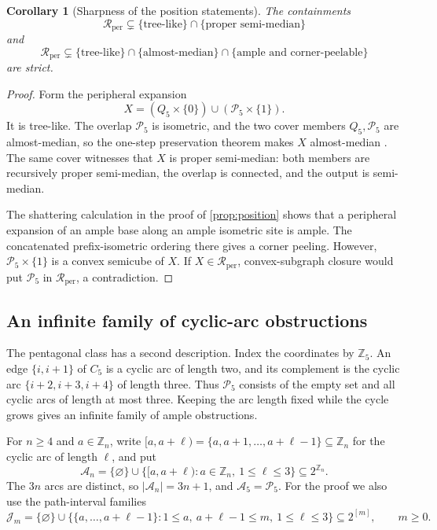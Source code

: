 \documentclass[11pt]{article}
\newtheorem{corollary}[theorem]{Corollary}
\theoremstyle{definition}
\theoremstyle{remark}
\newcommand{\Rper}{\mathcal R_{\mathrm{per}}}
\begin{document}
\begin{corollary}[Sharpness of the position statements]
\label{cor:position-sharp}
The containments
\[
 \Rper\subsetneq
 \{\text{tree-like}\}\cap\{\text{proper semi-median}\}
\]
and
\[
 \Rper\subsetneq
 \{\text{tree-like}\}\cap\{\text{almost-median}\}
 \cap\{\text{ample and corner-peelable}\}
\]
are strict.
\end{corollary}

\begin{proof}
Form the peripheral expansion
\[
 X=(Q_5\times\{0\})\cup(\mathcal P_5\times\{1\}).
\]
It is tree-like.  The overlap \(\mathcal P_5\) is isometric, and the two
cover members \(Q_5,\mathcal P_5\) are almost-median, so the one-step
preservation theorem makes \(X\) almost-median
\cite[Theorem~4]{BresarImrichKlavzar03fast}.  The same cover witnesses that
\(X\) is proper semi-median: both members are recursively proper
semi-median, the overlap is connected, and the output is semi-median.

The shattering calculation in the proof of \cref{prop:position} shows that a
peripheral expansion of an ample base along an ample isometric site is
ample.  The concatenated prefix-isometric ordering there gives a corner
peeling.  However, \(\mathcal P_5\times\{1\}\) is a convex semicube of
\(X\).  If \(X\in\Rper\), convex-subgraph closure would put
\(\mathcal P_5\) in \(\Rper\), a contradiction.
\end{proof}

\subsection{An infinite family of cyclic-arc obstructions}

The pentagonal class has a second description.  Index the coordinates by
\(\mathbb Z_5\).  An edge \(\{i,i+1\}\) of \(C_5\) is a cyclic arc of length
two, and its complement is the cyclic arc \(\{i+2,i+3,i+4\}\) of length three.
Thus \(\mathcal P_5\) consists of the empty set and all cyclic arcs of length
at most three.  Keeping the arc length fixed while the cycle grows gives an
infinite family of ample obstructions.

For \(n\ge4\) and \(a\in\mathbb Z_n\), write
\([a,a+\ell)=\{a,a+1,\ldots,a+\ell-1\}\subseteq\mathbb Z_n\) for the
cyclic arc of length \(\ell\), and put
\begin{equation}
 \mathcal A_n=\{\varnothing\}\cup
 \{[a,a+\ell):a\in\mathbb Z_n,\ 1\le\ell\le3\}
 \subseteq2^{\mathbb Z_n}.
 \label{eq:cyclic-arcs}
\end{equation}
The \(3n\) arcs are distinct, so \(|\mathcal A_n|=3n+1\), and
\(\mathcal A_5=\mathcal P_5\).  For the proof we also use the path-interval
families
\begin{equation}
 \mathcal J_m=\{\varnothing\}\cup
 \{\{a,\ldots,a+\ell-1\}:1\le a,\ a+\ell-1\le m,\ 1\le\ell\le3\}
 \subseteq2^{[m]},\qquad m\ge0.
 \label{eq:path-intervals}
\end{equation}
\end{document}
